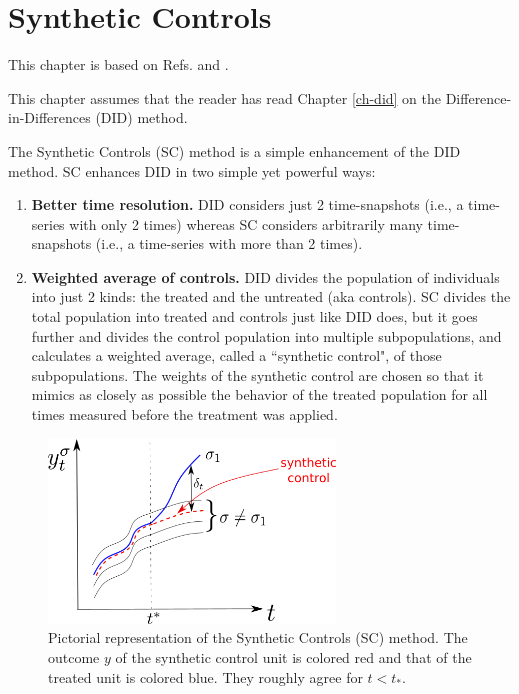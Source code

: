 \chapter{Synthetic Controls}
\label{ch-syn-con}

This chapter is based on Refs.\cite{alves-book}
and \cite{book-mixtape}.

This chapter assumes that
the reader has read Chapter \ref{ch-did}
on the Difference-in-Differences (DID) method.

The Synthetic Controls (SC) method
is a simple enhancement of the DID method.
SC enhances DID in two simple
yet powerful ways:
\begin{enumerate}
\item{\bf Better time resolution.}
DID considers just 2 time-snapshots 
(i.e., a 
time-series with only 2 times)
whereas SC considers
arbitrarily many time-snapshots (i.e., a time-series with
more than 2 times).
\item{\bf Weighted average of controls.}
DID divides the population
of individuals into just 2 kinds:
the treated and the untreated (aka controls).
SC
divides the 
total population 
into treated and controls
just like DID does, but
it goes further and divides the control population into
multiple subpopulations,
and calculates a weighted average,
called a
``synthetic control",
of those subpopulations.
The weights of the synthetic
control are chosen so that
it mimics as closely as possible
the behavior
of  the treated population for all times
measured before the treatment
was applied.
\end{enumerate}


\begin{figure}[h!]
\centering
\includegraphics[width=3in]
{syn-con/syn-con-p-lines.png}
\caption{Pictorial
representation of the Synthetic Controls (SC) method.
The outcome $y$ of the synthetic control unit
is colored red and that of the treated unit
is colored blue.
They 
roughly agree for $t<t_*$.
} 
\label{fig-syn-con-p-lines}
\end{figure}


